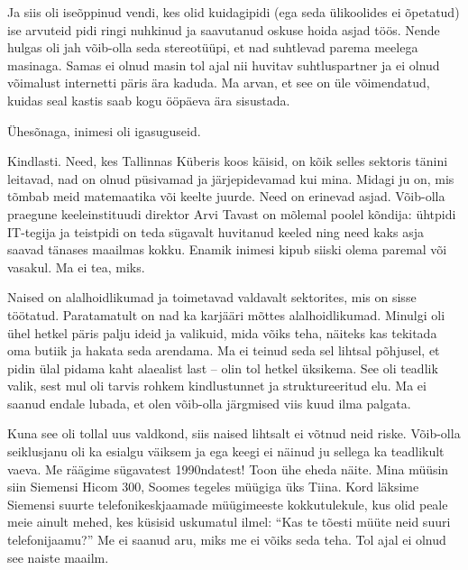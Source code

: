 Ja siis oli iseõppinud vendi, kes olid kuidagipidi (ega seda ülikoolides ei õpetatud) 
ise arvuteid pidi ringi nuhkinud ja saavutanud oskuse hoida asjad töös. 
Nende hulgas oli jah võib-olla seda stereotüüpi, et nad
suhtlevad parema meelega masinaga. Samas ei olnud masin tol ajal nii huvitav 
suhtluspartner ja ei olnud võimalust internetti päris ära kaduda. Ma arvan, et see on üle võimendatud, 
kuidas seal kastis saab kogu ööpäeva ära sisustada. 

Ühesõnaga, inimesi oli igasuguseid.


Kindlasti. Need, kes Tallinnas 
Küberis koos käisid, on kõik selles sektoris tänini leitavad, nad on olnud
püsivamad ja järjepidevamad kui mina. Midagi ju on, mis tõmbab meid
matemaatika või keelte juurde. Need on erinevad 
asjad. Võib-olla praegune 
keeleinstituudi direktor Arvi Tavast on mõlemal poolel 
kõndija: ühtpidi IT-tegija ja teistpidi on teda sügavalt huvitanud 
keeled ning need kaks asja saavad tänases maailmas kokku. Enamik inimesi 
kipub siiski olema paremal või vasakul. Ma ei tea, miks.

\label{sisu:tydrukud}

Naised on alalhoidlikumad ja toimetavad valdavalt sektorites, mis on 
sisse töötatud. Paratamatult on nad ka karjääri mõttes 
alalhoidlikumad. Minulgi oli ühel hetkel päris 
palju ideid ja valikuid, mida võiks teha, näiteks kas tekitada oma butiik ja 
hakata seda arendama. Ma ei teinud seda sel lihtsal põhjusel, et pidin ülal pidama kaht alaealist last -- olin tol hetkel üksikema. See oli teadlik valik, sest mul oli tarvis rohkem kindlustunnet ja struktureeritud elu. Ma 
ei saanud endale lubada, et olen võib-olla järgmised viis kuud ilma palgata. 

Kuna see oli tollal uus valdkond, siis naised lihtsalt ei võtnud neid riske. Võib-olla 
seiklusjanu oli ka esialgu väiksem ja ega keegi ei näinud ju 
sellega ka teadlikult vaeva. Me räägime sügavatest 1990ndatest! Toon ühe
eheda näite. Mina müüsin siin Siemensi Hicom 300, Soomes tegeles müügiga üks Tiina. Kord läksime 
Siemensi suurte telefonikeskjaamade müügimeeste kokkutulekule, kus olid peale meie ainult 
mehed, kes küsisid uskumatul ilmel: 
\enquote{Kas te tõesti müüte neid suuri telefonijaamu?} Me ei saanud aru, miks 
me ei võiks seda teha. Tol ajal ei olnud see naiste maailm. 

